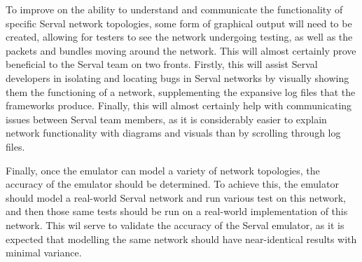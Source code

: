 To improve on the ability to understand and communicate the functionality of specific Serval network topologies, some form of graphical output will need to be created, allowing for testers to see the network undergoing testing, as well as the packets and bundles moving around the network.
This will almost certainly prove beneficial to the Serval team on two fronts. 
Firstly, this will assist Serval developers in isolating and locating bugs in Serval networks by visually showing them the functioning of a network, supplementing the expansive log files that the frameworks produce.
Finally, this will almost certainly help with communicating issues between Serval team members, as it is considerably easier to explain network functionality with diagrams and visuals than by scrolling through log files.

Finally, once the emulator can model a variety of network topologies, the accuracy of the emulator should be determined.
To achieve this, the emulator should model a real-world Serval network and run various test on this network, and then those same tests should be run on a real-world implementation of this network.
This wil serve to validate the accuracy of the Serval emulator, as it is expected that modelling the same network should have near-identical results with minimal variance.